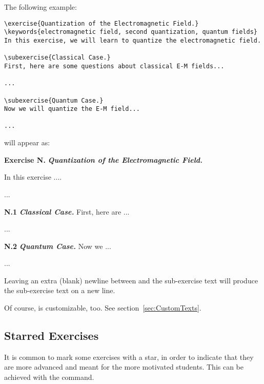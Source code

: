 \documentclass[11pt,a4paper]{article}
\begin{document}
The following example:
\begin{pkgverbatim}
\begin{verbatim}
\exercise{Quantization of the Electromagnetic Field.}
\keywords{electromagnetic field, second quantization, quantum fields}
In this exercise, we will learn to quantize the electromagnetic field.

\subexercise{Classical Case.}
First, here are some questions about classical E-M fields...

...

\subexercise{Quantum Case.}
Now we will quantize the E-M field...

...

\end{verbatim}
\end{pkgverbatim}
will appear as:
\begin{pkgverbatim}[0mm]
  {\bf Exercise N.} \hspace*{2mm} {\em\bfseries Quantization of the Electromagnetic Field.}

  In this exercise ....

  ...

  {\bf N.1}\hspace*{1mm} {\em\bfseries Classical Case.}\hspace*{3mm} First, here are ...

  ...

  {\bf N.2}\hspace*{1mm} {\em\bfseries Quantum Case.}\hspace*{3mm} Now we ...

  ...
  
\end{pkgverbatim}

\begin{pkgtip}
  Leaving an extra (blank) newline between  and the sub-exercise text
  will produce the sub-exercise text on a new line.
\end{pkgtip}

\begin{pkgtip}
  Of course,  is customizable, too. See section~\ref{sec:CustomTexts}.
\end{pkgtip}


\subsection{Starred Exercises}

It is common to mark some exercises with a star, in order to indicate that they are more
advanced and meant for the more motivated students.
This can be achieved with the  command.
\end{document}
